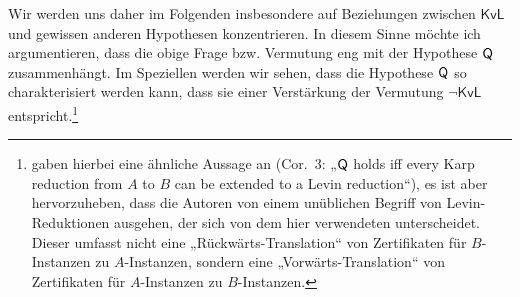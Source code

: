 Wir werden uns daher im Folgenden insbesondere auf Beziehungen zwischen $\mathsf{KvL}$ und gewissen anderen Hypothesen konzentrieren.
In diesem Sinne möchte ich argumentieren, dass die obige Frage bzw. Vermutung eng mit der Hypothese $\mathsf{Q}$ zusammenhängt.
Im Speziellen werden wir sehen, dass die Hypothese $\mathsf{Q}$ so charakterisiert werden kann, dass sie einer Verstärkung der Vermutung $\neg\mathsf{KvL}$ entspricht.\footnote{\textcite{fenner_inverting_2003} gaben hierbei eine ähnliche Aussage an (Cor.~3: „$\mathsf{Q}$ holds iff every Karp reduction from $A$ to $B$ can be extended to a Levin reduction“), es ist aber hervorzuheben, dass die Autoren von einem unüblichen Begriff von Levin-Reduktionen ausgehen, der sich von dem hier verwendeten unterscheidet. Dieser umfasst nicht eine „Rückwärts-Translation“ von Zertifikaten für $B$-Instanzen zu $A$-Instanzen, sondern eine „Vorwärts-Translation“ von Zertifikaten für $A$-Instanzen zu $B$-Instanzen.}

